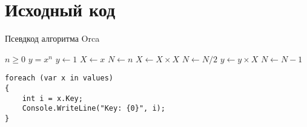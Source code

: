 \chapter{Исходный код}
\begin{algorithm}
\caption{Псевдкод алгоритма Orca}
\begin{algorithmic}[1]
\REQUIRE $n \geq 0$
\ENSURE $y = x^n$
\STATE $y \leftarrow 1$
\STATE $X \leftarrow x$
\STATE $N \leftarrow n$
\STATE $X \leftarrow X \times X$
\STATE $N \leftarrow N / 2$
\ELSE[$N$ is odd]
\STATE $y \leftarrow y \times X$
\STATE $N \leftarrow N - 1$
\ENDIF
\ENDWHILE
\end{algorithmic}
\end{algorithm}

\begin{lstlisting}
foreach (var x in values)
{
	int i = x.Key;
	Console.WriteLine("Key: {0}", i);
}
\end{lstlisting}